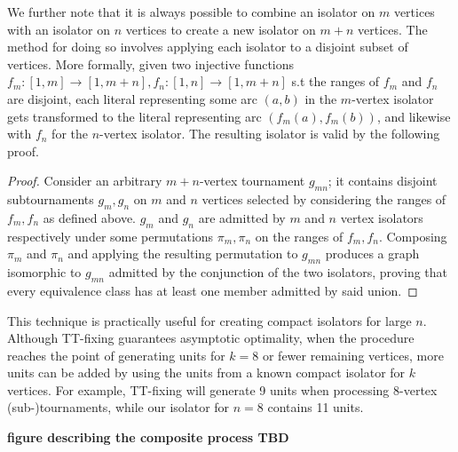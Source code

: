 \documentclass[conference]{IEEEtran}
\begin{document}
 We further note that it is always possible to combine an isolator on $m$ vertices with an isolator on $n$ vertices to create a new isolator on $m+n$ vertices. The method for doing so involves applying each isolator to a disjoint subset of vertices. More formally, given two injective functions $f_m: [1,m] \rightarrow [1,m+n], f_n: [1,n] \rightarrow [1,m+n]$ s.t the ranges of $f_m$ and $f_n$ are disjoint, each literal representing some arc $(a,b)$ in the $m$-vertex isolator gets transformed to the literal representing arc $(f_m(a), f_m(b))$, and likewise with $f_n$ for the $n$-vertex isolator. The resulting isolator is valid by the following proof.

\begin{proof}
 Consider an arbitrary $m+n$-vertex tournament $g_{mn}$; it contains disjoint subtournaments $g_m,g_n$ on $m$ and $n$ vertices selected by considering the ranges of $f_m, f_n$ as defined above. $g_m$ and $g_n$ are admitted by $m$ and $n$ vertex isolators respectively under some permutations $\pi_m,\pi_n$ on the ranges of $f_m, f_n$. Composing $\pi_m$ and $\pi_n$ and applying the resulting permutation to $g_{mn}$ produces a graph isomorphic to $g_{mn}$ admitted by the conjunction of the two isolators, proving that every equivalence class has at least one member admitted by said union.
\end{proof}

This technique is practically useful for creating compact isolators for large $n$. Although TT-fixing guarantees asymptotic optimality, when the procedure reaches the point of generating units for $k=8$ or fewer remaining vertices, more units can be added by using the units from a known compact isolator for $k$ vertices. For example, TT-fixing will generate 9 units when processing 8-vertex (sub-)tournaments, while our isolator for $n=8$ contains 11 units.

\textbf{figure describing the composite process TBD}

\end{document}
